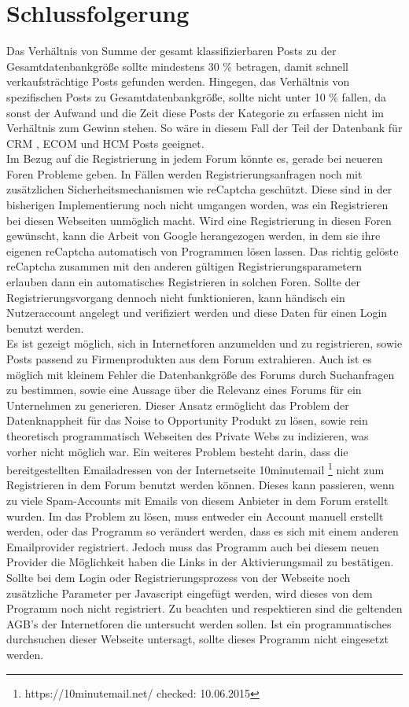\section{Schlussfolgerung}
Das Verhältnis von Summe der gesamt klassifizierbaren Posts zu der Gesamtdatenbankgröße sollte mindestens 30 \% betragen, damit schnell verkaufsträchtige Posts gefunden werden. Hingegen, das Verhältnis von spezifischen Posts zu Gesamtdatenbankgröße, sollte nicht unter 10 \% fallen, da sonst der Aufwand und die Zeit diese Posts der Kategorie zu erfassen nicht im Verhältnis zum Gewinn stehen. So wäre in diesem Fall der Teil der Datenbank für CRM , ECOM und HCM Posts geeignet.\\
Im Bezug auf die Registrierung in jedem Forum könnte es, gerade bei neueren Foren Probleme geben. In Fällen werden Registrierungsanfragen noch mit zusätzlichen Sicherheitsmechanismen wie reCaptcha geschützt. Diese sind in der bisherigen Implementierung noch nicht umgangen worden, was ein Registrieren bei diesen Webseiten unmöglich macht. Wird eine Registrierung in diesen Foren gewünscht, kann die Arbeit von Google herangezogen werden, in dem sie ihre eigenen reCaptcha automatisch von Programmen lösen lassen. Das richtig gelöste reCaptcha zusammen mit den anderen gültigen Registrierungsparametern erlauben dann ein automatisches Registrieren in solchen Foren. Sollte der Registrierungsvorgang dennoch nicht funktionieren, kann händisch ein Nutzeraccount angelegt und verifiziert werden und diese Daten für einen Login benutzt werden.\\
Es ist gezeigt möglich, sich in Internetforen anzumelden und zu registrieren, sowie Posts passend zu Firmenprodukten aus dem Forum extrahieren.
Auch ist es möglich mit kleinem Fehler die Datenbankgröße des Forums durch Suchanfragen zu bestimmen, sowie eine Aussage über die Relevanz eines Forums für ein Unternehmen zu generieren. Dieser Ansatz ermöglicht das Problem der Datenknappheit für das Noise to Opportunity Produkt zu lösen, sowie rein theoretisch programmatisch Webseiten des Private Webs zu indizieren, was vorher nicht möglich war. Ein weiteres Problem besteht darin, dass die bereitgestellten Emailadressen von der Internetseite 10minutemail \footnote{https://10minutemail.net/ checked: 10.06.2015} nicht zum Registrieren in dem Forum benutzt werden können. Dieses kann passieren, wenn zu viele Spam-Accounts mit Emails von diesem Anbieter in dem Forum erstellt wurden. Im das Problem zu lösen, muss entweder ein Account manuell erstellt werden, oder das Programm so verändert werden, dass es sich mit einem anderen Emailprovider registriert. Jedoch muss das Programm auch bei diesem neuen Provider die Möglichkeit haben die Links in der Aktivierungsmail zu bestätigen.
Sollte bei dem Login oder Registrierungsprozess von der Webseite noch zusätzliche Parameter per Javascript eingefügt werden, wird dieses von dem Programm noch nicht registriert.
Zu beachten und respektieren sind die geltenden AGB's der Internetforen die untersucht werden sollen. Ist ein programmatisches durchsuchen dieser Webseite untersagt, sollte dieses Programm nicht eingesetzt werden.

